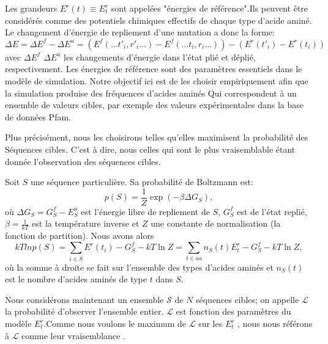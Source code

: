 Les grandeurs $E^r(t) \equiv E_t^r$ sont appelées "énergies de référence".Ils peuvent être considérés comme des potentiels chimiques effectifs de chaque type d'acide aminé. Le changement d'énergie de repliement d'une mutation a donc la forme:
\begin{equation} \label{eq:deltaE}
  \Delta E=\Delta E^f - \Delta E^u=(E^f(...t'_i,r'_i...) - E^f(...t_i,r_i...)) -(E^r(t'_i) - E^r(t_i))
\end{equation} 
avec $\Delta E^f$  $\Delta E^u$ les changements d'énergie dans l'état plié et déplié, respectivement.
Les énergies de référence sont des paramètres essentiels dans le modèle de simulation. Notre objectif ici
est de les choisir empiriquement afin que la simulation produise des fréquences d'acides aminés
Qui correspondent à un ensemble de valeurs cibles, par exemple des valeurs expérimentales dans la base de données Pfam.

Plus précisément, nous les choisirons telles qu'elles maximisent la probabilité des
Séquences cibles. C'est à dire, nous celles qui sont le plus vraisemblable étant donnée l'observation des séquences cibles.

Soit $S$ une séquence particulière. Sa probabilité de Boltzmann est:
\begin{equation}
  p(S)=\frac{1}{Z}\exp(-\beta \Delta G_S),
\end{equation}
où $\Delta G_S=G_S^f - E^u_S $ est l'énergie libre de repliement de $S$, $G^f_S$ est de l'état replié,$\beta =\frac{1}{kT}$ est la température inverse et $Z$ une constante de normalisation (la fonction de partition). Nous avons alors
\begin{equation}
kTln p(S) = \sum_{i\in S} E^r(t_i) - G^f_S - kT \ln Z = \sum_{t\in aa}n_S(t)E^r_t - G^f_S - kT\ln Z,
\end{equation}
où la somme à droite se fait sur l'ensemble des types d'acides aminés et $n_S(t)$ est le nombre d'acides aminés de type $t$ dans $S$.

Nous considérons maintenant un ensemble $\mathcal{S}$ de $N$ séquences cibles; on appelle $\mathcal{L}$ la probabilité d'observer l'ensemble entier. $\mathcal{L}$ est fonction des paramètres du modèle $E_t^r$.Comme nous voulons le maximum de $\mathcal{L}$ sur les $E_t^r$ , nous nous référons  à  $\mathcal{L}$ comme leur vraisemblance \cite{Kleinman06}.

